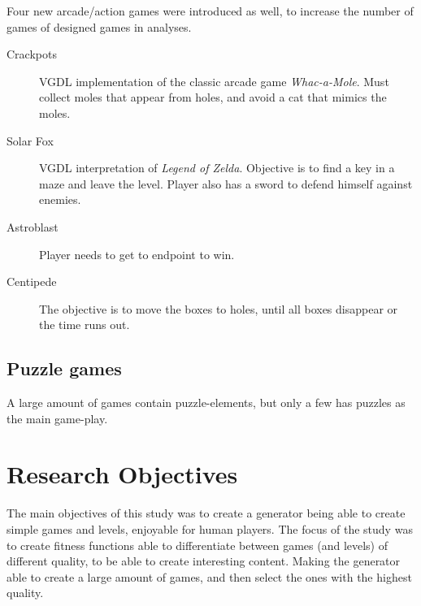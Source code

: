 \documentclass[a4paper,titlepage,final, twoside]{report}
\begin{document}
Four new arcade/action games were introduced as well, to increase the number of games of designed games in analyses. 
\begin{description}
\item [Crackpots] VGDL implementation of the classic arcade game \emph{Whac-a-Mole}. Must collect moles that appear from holes, and avoid a cat that mimics the moles.
\item [Solar Fox] VGDL interpretation of \emph{Legend of Zelda}. Objective is to find a key in a maze and leave the level. Player also has a sword to defend himself against enemies.
\item [Astroblast] Player needs to get to endpoint to win.
\item [Centipede] The objective is to move the boxes to holes, until all boxes disappear or the time runs out.
\end{description}




\section{Puzzle games}
A large amount of games contain puzzle-elements, but only a few has puzzles as the main game-play.



\chapter{Research Objectives}
The main objectives of this study was to create a generator being able to create simple games and levels, enjoyable for human players.
The focus of the study was to create fitness functions able to differentiate between games (and levels) of different quality, to be able to create interesting content. Making the generator able to create a large amount of games, and then select the ones with the highest quality.
\end{document}
